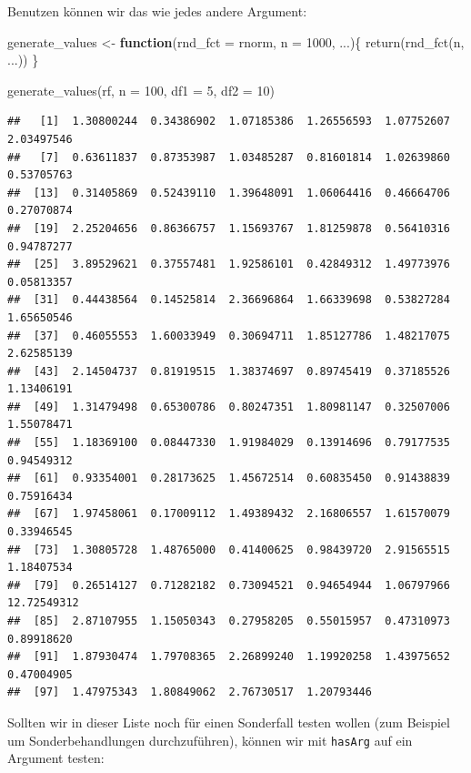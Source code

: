 \documentclass[
]{book}
\newenvironment{Shaded}{\begin{snugshade}}{\end{snugshade}}
\newcommand{\AttributeTok}[1]{\textcolor[rgb]{0.77,0.63,0.00}{#1}}
\newcommand{\ControlFlowTok}[1]{\textcolor[rgb]{0.13,0.29,0.53}{\textbf{#1}}}
\newcommand{\DecValTok}[1]{\textcolor[rgb]{0.00,0.00,0.81}{#1}}
\newcommand{\FunctionTok}[1]{\textcolor[rgb]{0.00,0.00,0.00}{#1}}
\newcommand{\NormalTok}[1]{#1}
\newcommand{\OtherTok}[1]{\textcolor[rgb]{0.56,0.35,0.01}{#1}}
\begin{document}
Benutzen können wir das wie jedes andere Argument:

\begin{Shaded}
\begin{Highlighting}[]
\NormalTok{generate\_values }\OtherTok{\textless{}{-}} \ControlFlowTok{function}\NormalTok{(}\AttributeTok{rnd\_fct =}\NormalTok{ rnorm,}
                            \AttributeTok{n =} \DecValTok{1000}\NormalTok{,}
\NormalTok{                            ...)\{}
  \FunctionTok{return}\NormalTok{(}\FunctionTok{rnd\_fct}\NormalTok{(n, ...))}
\NormalTok{\}}

\FunctionTok{generate\_values}\NormalTok{(rf, }\AttributeTok{n =} \DecValTok{100}\NormalTok{, }\AttributeTok{df1 =} \DecValTok{5}\NormalTok{, }\AttributeTok{df2 =} \DecValTok{10}\NormalTok{)}
\end{Highlighting}
\end{Shaded}

\begin{verbatim}
##   [1]  1.30800244  0.34386902  1.07185386  1.26556593  1.07752607  2.03497546
##   [7]  0.63611837  0.87353987  1.03485287  0.81601814  1.02639860  0.53705763
##  [13]  0.31405869  0.52439110  1.39648091  1.06064416  0.46664706  0.27070874
##  [19]  2.25204656  0.86366757  1.15693767  1.81259878  0.56410316  0.94787277
##  [25]  3.89529621  0.37557481  1.92586101  0.42849312  1.49773976  0.05813357
##  [31]  0.44438564  0.14525814  2.36696864  1.66339698  0.53827284  1.65650546
##  [37]  0.46055553  1.60033949  0.30694711  1.85127786  1.48217075  2.62585139
##  [43]  2.14504737  0.81919515  1.38374697  0.89745419  0.37185526  1.13406191
##  [49]  1.31479498  0.65300786  0.80247351  1.80981147  0.32507006  1.55078471
##  [55]  1.18369100  0.08447330  1.91984029  0.13914696  0.79177535  0.94549312
##  [61]  0.93354001  0.28173625  1.45672514  0.60835450  0.91438839  0.75916434
##  [67]  1.97458061  0.17009112  1.49389432  2.16806557  1.61570079  0.33946545
##  [73]  1.30805728  1.48765000  0.41400625  0.98439720  2.91565515  1.18407534
##  [79]  0.26514127  0.71282182  0.73094521  0.94654944  1.06797966 12.72549312
##  [85]  2.87107955  1.15050343  0.27958205  0.55015957  0.47310973  0.89918620
##  [91]  1.87930474  1.79708365  2.26899240  1.19920258  1.43975652  0.47004905
##  [97]  1.47975343  1.80849062  2.76730517  1.20793446
\end{verbatim}

Sollten wir in dieser Liste noch für einen Sonderfall testen wollen (zum Beispiel um Sonderbehandlungen durchzuführen), können wir mit \texttt{hasArg} auf ein Argument testen:
\end{document}
